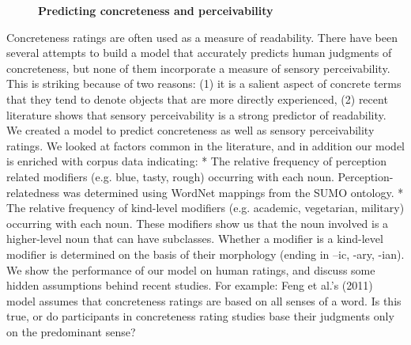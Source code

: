 \documentclass[10pt, a4paper, twopage, headinclude, footinclude, BCOR5mm]{book}
\begin{document}
\newpage

\begin{figure}[t!]
\centering
\large\textbf{Predicting concreteness and perceivability}
\vspace*{0.5cm}
\end{figure}


\begin{table}[t!]
\end{table} 
\noindent
Concreteness ratings are often used as a measure of readability. There have been several attempts to build a model that accurately predicts human judgments of concreteness, but none of them incorporate a measure of sensory perceivability. This is striking because of two reasons: (1) it is a salient aspect of concrete terms that they tend to denote objects that are more directly experienced, (2) recent literature shows that sensory perceivability is a strong predictor of readability.  We created a model to predict concreteness as well as sensory perceivability ratings. We looked at factors common in the literature, and in addition our model is enriched with corpus data indicating: * The relative frequency of perception related modifiers (e.g. blue, tasty, rough) occurring with each noun. Perception-relatedness was determined using WordNet mappings from the SUMO ontology. * The relative frequency of kind-level modifiers (e.g. academic, vegetarian, military) occurring with each noun. These modifiers show us that the noun involved is a higher-level noun that can have subclasses. Whether a modifier is a kind-level modifier is determined on the basis of their morphology (ending in –ic, -ary, -ian).  We show the performance of our model on human ratings, and discuss some hidden assumptions behind recent studies. For example: Feng et al.'s (2011) model assumes that concreteness ratings are based on all senses of a word. Is this true, or do participants in concreteness rating studies base their judgments only on the predominant sense?  
\end{document}
